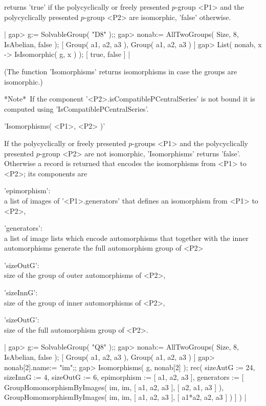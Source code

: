 returns 'true' if the polycyclically or freely presented $p$-group <P1> and  
the polycyclically presented $p$-group <P2> are isomorphic,
'false' otherwise.

|    gap> g:= SolvableGroup( "D8" );;
    gap> nonab:= AllTwoGroups( Size, 8, IsAbelian, false );
    [ Group( a1, a2, a3 ), Group( a1, a2, a3 ) ]
    gap> List( nonab, x -> IsIsomorphic( g, x ) );
    [ true, false ] |

(The function 'Isomorphisms' returns isomorphisms in case the groups are
isomorphic.)

*Note*\:\ If the component '<P2>.isCompatiblePCentralSeries' is not bound
it is computed using 'IsCompatiblePCentralSeries'.


'Isomorphisms( <P1>, <P2> )'

If the polycyclically or freely presented $p$-groups <P1> and the 
polycyclically presented $p$-group <P2> are not isomorphic,
'Isomorphisms' returns 'false'.
Otherwise a record is returned that encodes the isomorphisms from <P1> to
<P2>; its components are

'epimorphism':\\  a list of images of '<P1>.generators' that defines an
                  isomorphism from <P1> to <P2>,

'generators':\\   a list of image lists which encode automorphisms that
                  together with the inner automorphisms generate the full
                  automorphism group of <P2>

'sizeOutG':\\     size of the group of outer automorphisms of <P2>,

'sizeInnG':\\     size of the group of inner automorphisms of <P2>,

'sizeOutG':\\     size of the full automorphism group of <P2>.

|    gap> g:= SolvableGroup( "Q8" );;
    gap> nonab:= AllTwoGroups( Size, 8, IsAbelian, false );
    [ Group( a1, a2, a3 ), Group( a1, a2, a3 ) ]
    gap> nonab[2].name:= "im";;
    gap> Isomorphisms( g, nonab[2] );
    rec(
    sizeAutG := 24,
    sizeInnG := 4,
    sizeOutG := 6,
    epimorphism := [ a1, a2, a3 ],
    generators := 
    [ GroupHomomorphismByImages( im, im, [ a1, a2, a3 ], [ a2, a1, a3 ] ),
      GroupHomomorphismByImages( im, im, [ a1, a2, a3 ], [ a1*a2, a2, a3
         ] ) ] ) |

